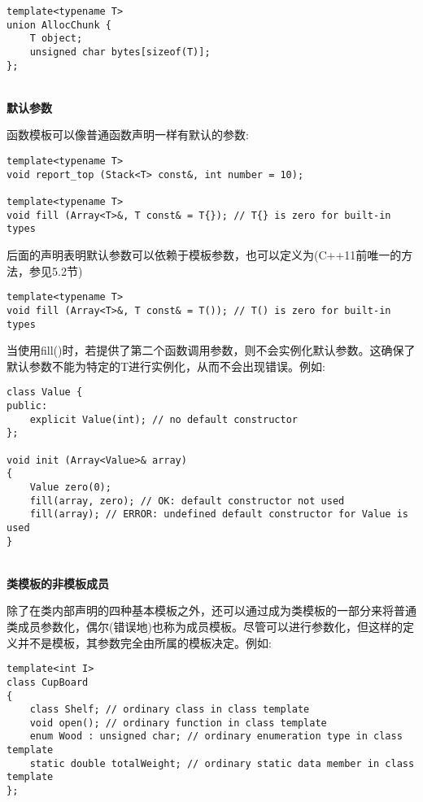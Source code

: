 \begin{lstlisting}[style=styleCXX]
template<typename T>
union AllocChunk {
	T object;
	unsigned char bytes[sizeof(T)];
};
\end{lstlisting}

\hspace*{\fill} \\ %
\noindent
\textbf{默认参数}

函数模板可以像普通函数声明一样有默认的参数:

\begin{lstlisting}[style=styleCXX]
template<typename T>
void report_top (Stack<T> const&, int number = 10);

template<typename T>
void fill (Array<T>&, T const& = T{}); // T{} is zero for built-in types
\end{lstlisting}

后面的声明表明默认参数可以依赖于模板参数，也可以定义为(C++11前唯一的方法，参见5.2节)

\begin{lstlisting}[style=styleCXX]
template<typename T>
void fill (Array<T>&, T const& = T()); // T() is zero for built-in types
\end{lstlisting}

当使用fill()时，若提供了第二个函数调用参数，则不会实例化默认参数。这确保了默认参数不能为特定的T进行实例化，从而不会出现错误。例如:

\begin{lstlisting}[style=styleCXX]
class Value {
public:
	explicit Value(int); // no default constructor
};

void init (Array<Value>& array)
{
	Value zero(0);
	fill(array, zero); // OK: default constructor not used
	fill(array); // ERROR: undefined default constructor for Value is used
}
\end{lstlisting}

\hspace*{\fill} \\ %
\noindent
\textbf{类模板的非模板成员}

除了在类内部声明的四种基本模板之外，还可以通过成为类模板的一部分来将普通类成员参数化，偶尔(错误地)也称为成员模板。尽管可以进行参数化，但这样的定义并不是模板，其参数完全由所属的模板决定。例如:

\begin{lstlisting}[style=styleCXX]
template<int I>
class CupBoard
{
	class Shelf; // ordinary class in class template
	void open(); // ordinary function in class template
	enum Wood : unsigned char; // ordinary enumeration type in class template
	static double totalWeight; // ordinary static data member in class template
};
\end{lstlisting}

